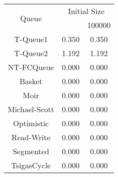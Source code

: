 \begin{tabular}{|c|c|c|}
\hline
\multirow{2}{*}{Queue} & \multicolumn{2}{c|}{Initial Size}\\\cline{2-3}& \qquad 10000 \qquad\quad & 100000\\
\hline
\hline
T-Queue1 & 0.350 & 0.350\\
T-Queue2 & 1.192 & 1.192\\
NT-FCQueue & 0.000 & 0.000\\
Basket & 0.000 & 0.000\\
Moir & 0.000 & 0.000\\
Michael-Scott & 0.000 & 0.000\\
Optimistic & 0.000 & 0.000\\
Read-Write & 0.000 & 0.000\\
Segmented & 0.000 & 0.000\\
TsigasCycle & 0.000 & 0.000\\
\hline\end{tabular}
